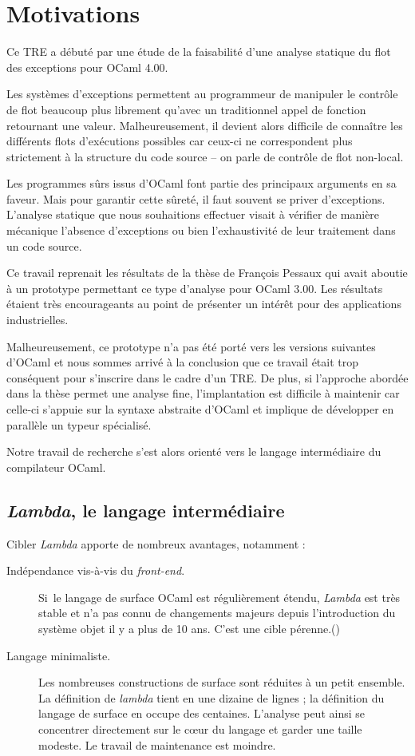 \section{Motivations}

Ce TRE a débuté par une étude de la faisabilité d'une analyse statique du
flot des exceptions pour OCaml 4.00. 

Les systèmes d'exceptions permettent au programmeur de manipuler le contrôle de
flot beaucoup plus librement qu'avec un traditionnel appel de fonction
retournant une valeur. Malheureusement, il devient alors difficile de connaître
les différents flots d'exécutions possibles car ceux-ci ne correspondent plus
strictement à la structure du code source -- on parle de contrôle de flot
non-local.

Les programmes sûrs issus d'OCaml font partie des principaux arguments en sa
faveur. Mais pour garantir cette sûreté, il faut souvent se priver
d'exceptions.  L'analyse statique que nous souhaitions effectuer visait à
vérifier de manière mécanique l'absence d'exceptions ou bien l'exhaustivité de
leur traitement dans un code source.

Ce travail reprenait les résultats de la thèse de François Pessaux
\cite{ExcAnalysis} qui avait aboutie à un prototype permettant ce type
d'analyse pour OCaml 3.00.  Les résultats étaient très encourageants au point
de présenter un intérêt pour des applications industrielles.

Malheureusement, ce prototype n'a pas été porté vers les versions suivantes
d'OCaml et nous sommes arrivé à la conclusion que ce travail était trop
conséquent pour s'inscrire dans le cadre d'un TRE.  De plus, si l'approche
abordée dans la thèse permet une analyse fine, l'implantation est difficile à
maintenir car celle-ci s'appuie sur la syntaxe abstraite d'OCaml et implique de
développer en parallèle un typeur spécialisé.

Notre travail de recherche s'est alors orienté vers le langage intermédiaire du
compilateur OCaml. 

\subsection{\emph{Lambda}, le langage intermédiaire}

Cibler \emph{Lambda} apporte de nombreux avantages, notamment :
\begin{description}
  \item[Indépendance vis-à-vis du \emph{front-end}.] Si le langage de surface
    OCaml est régulièrement étendu, \emph{Lambda} est très stable et n'a pas
    connu de changements majeurs depuis l'introduction du système objet il y a
    plus de 10 ans. C'est une cible pérenne.()
  \item[Langage minimaliste.]
    Les nombreuses constructions de surface sont réduites à un petit ensemble.
		La définition de \emph{lambda} tient en une dizaine de lignes ;
		la définition du langage de surface en occupe des centaines.
    L'analyse peut ainsi se concentrer directement sur le cœur du langage et
    garder une taille modeste. Le travail de maintenance est moindre.
\end{description}

